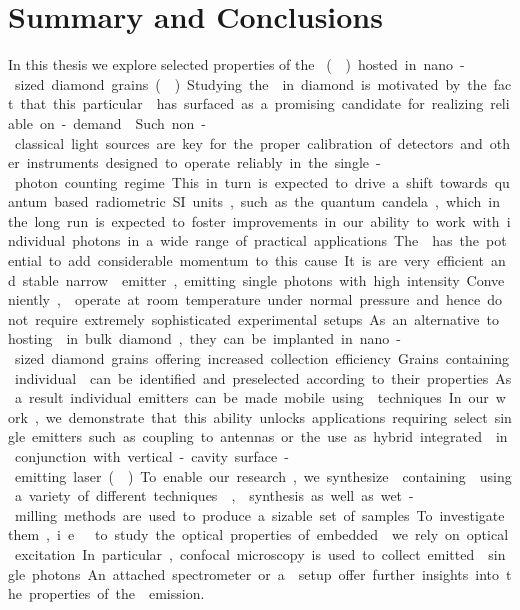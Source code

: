 

 \chapter{Summary and Conclusions}	\label{ch::conclusion}

   In this thesis we explore selected properties of the \si \cc (\siv) hosted in nano-sized diamond grains (\nds). Studying the \sivc in diamond is motivated by the fact that this particular \cc has surfaced as a promising candidate for realizing reliable on-demand \spss. Such non-classical light sources are key for the proper calibration of detectors and other instruments designed to operate reliably in the single-photon counting regime. This in turn is expected to drive a shift towards quantum based radiometric SI units, such as the quantum candela, which in the long run is expected to foster improvements in our ability to work with individual photons in a wide range of practical applications.

   The \siv has the potential to add considerable momentum to this cause. It is are very efficient and stable narrow \lw emitter, emitting single photons with high intensity. Conveniently, \sivs operate at room temperature under normal pressure and hence do not require extremely sophisticated experimental setups. As an alternative to hosting \sivs in bulk diamond, they can be implanted in nano-sized diamond grains offering increased collection efficiency. Grains containing individual \sivs can be identified and preselected according to their properties. As a result individual emitters can be made mobile using \pp techniques. In our work, we demonstrate that this ability unlocks applications requiring select single emitters such as coupling to antennas or the use as hybrid integrated \spss in conjunction with vertical-cavity surface-emitting laser (\VCSEL).

   To enable our research, we synthesize \nds containing \sivs using a variety of different techniques. \Cvd, \hpht synthesis as well as wet-milling methods are used to produce a sizable set of samples. To investigate them, i.e\ to study the optical properties of embedded \sivs we rely on optical excitation. In particular, confocal microscopy is used to collect emitted \fl single photons. An attached spectrometer or a \HBT setup offer further insights into the properties of the \fl emission.

